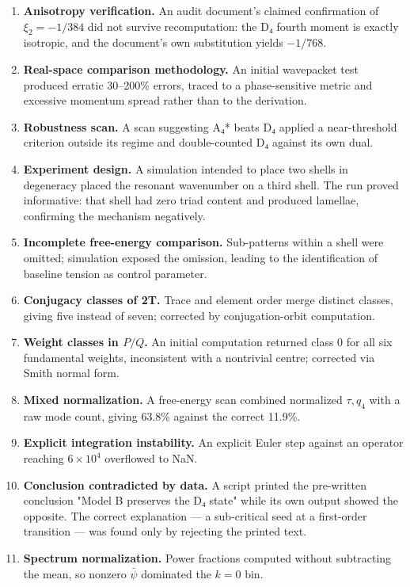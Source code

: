 \documentclass[a4paper,11pt]{article}
\begin{document}
\begin{enumerate}
\item \textbf{Anisotropy verification.} An audit document's claimed confirmation of $\xi_2=-1/384$ did not survive recomputation: the D₄ fourth moment is exactly isotropic, and the document's own substitution yields $-1/768$.
\item \textbf{Real-space comparison methodology.} An initial wavepacket test produced erratic 30–200\% errors, traced to a phase-sensitive metric and excessive momentum spread rather than to the derivation.
\item \textbf{Robustness scan.} A scan suggesting A₄* beats D₄ applied a near-threshold criterion outside its regime and double-counted D₄ against its own dual.
\item \textbf{Experiment design.} A simulation intended to place two shells in degeneracy placed the resonant wavenumber on a third shell. The run proved informative: that shell had zero triad content and produced lamellae, confirming the mechanism negatively.
\item \textbf{Incomplete free-energy comparison.} Sub-patterns within a shell were omitted; simulation exposed the omission, leading to the identification of baseline tension as control parameter.
\item \textbf{Conjugacy classes of 2T.} Trace and element order merge distinct classes, giving five instead of seven; corrected by conjugation-orbit computation.
\item \textbf{Weight classes in $P/Q$.} An initial computation returned class 0 for all six fundamental weights, inconsistent with a nontrivial centre; corrected via Smith normal form.
\item \textbf{Mixed normalization.} A free-energy scan combined normalized $\tau,q_4$ with a raw mode count, giving 63.8\% against the correct 11.9\%.
\item \textbf{Explicit integration instability.} An explicit Euler step against an operator reaching $6\times10^4$ overflowed to NaN.
\item \textbf{Conclusion contradicted by data.} A script printed the pre-written conclusion "Model B preserves the D₄ state" while its own output showed the opposite. The correct explanation — a sub-critical seed at a first-order transition — was found only by rejecting the printed text.
\item \textbf{Spectrum normalization.} Power fractions computed without subtracting the mean, so nonzero $\bar\psi$ dominated the $k=0$ bin.

\end{enumerate}
\end{document}
